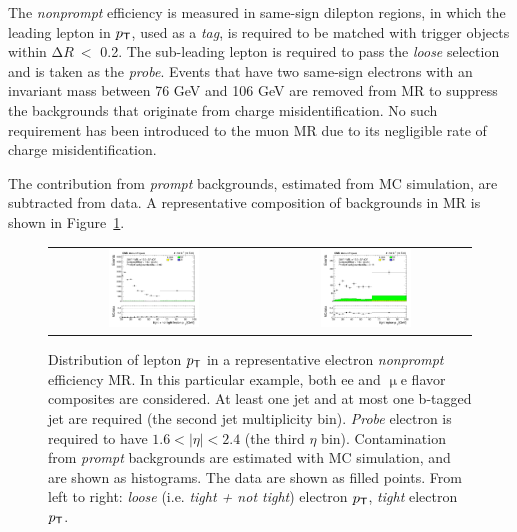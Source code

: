 The \emph{nonprompt} efficiency is measured in same-sign dilepton regions, in which the leading lepton in $p_{\textsf{T}}$, used as a \emph{tag}, is required to be matched with trigger objects within $\mathrm{\Delta}R~<$ 0.2. The sub-leading lepton is required to pass the \emph{loose} selection and is taken as the \emph{probe}. Events that have two same-sign electrons with an invariant mass between 76 GeV and 106 GeV are removed from \ac{MR} to suppress the backgrounds that originate from charge misidentification. No such requirement has been introduced to the muon \ac{MR} due to its negligible rate of  charge misidentification.

The contribution from \emph{prompt} backgrounds, estimated from \ac{MC} simulation, are subtracted from data. A representative composition of backgrounds in \ac{MR} is shown in Figure~\ref{fig:MRexample}. 

\begin{figure}[tbh!]
 \begin{center}
 \begin{tabular}{cc}
 \includegraphics[width=0.45\textwidth]{figures/Part3/Nonprompt/MR/FlepPt}&
 \includegraphics[width=0.45\textwidth]{figures/Part3/Nonprompt/MR/TlepPt} \\
 \end{tabular}
 \caption{Distribution of lepton $p_{\textsf{T}}$ in a representative electron \emph{nonprompt} efficiency \ac{MR}. In this particular example, both ee and $\upmu$e flavor composites are considered. At least one jet and at most one b-tagged jet are required (the second jet multiplicity bin). \emph{Probe} electron is required to have $1.6<|\eta|<2.4$ (the third $\eta$ bin). Contamination from \emph{prompt} backgrounds are estimated with \ac{MC} simulation, and are shown as histograms. The data are shown as filled points. From left to right: \emph{loose} (i.e. \emph{tight + not tight}) electron $p_{\textsf{T}}$, \emph{tight} electron $p_{\textsf{T}}$.}
 \label{fig:MRexample}
 \end{center}
\end{figure}

